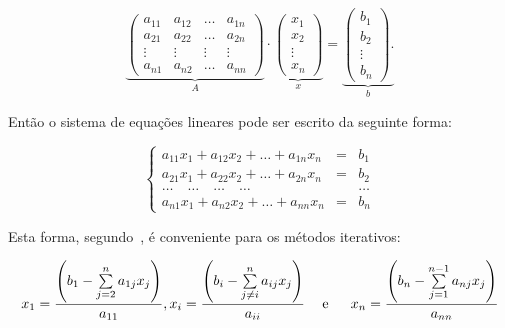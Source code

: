 \documentclass[glenn,refnum,codigo]{Estilo}
\begin{document}
\[
\underbrace{\left(
	\begin{array}{cccccc}
	a_{11} & a_{12} & \ldots & a_{1n} \\
	a_{21} & a_{22} & \ldots &a_{2n}  \\
	\vdots &\vdots  & \vdots &\vdots  \\
	a_{n1}&a_{n2}&\ldots &a_{nn}
	\end{array}
	\right)}_{A} %
\cdot
\underbrace{\left(
	\begin{array}{cccccc}
	x_{1}  \\
	x_{2}  \\
	\vdots \\
	x_{n}
	\end{array}
	\right)}_{x} %
=
\underbrace{\left(
	\begin{array}{cccccc}
	b_{1}\\
	b_{2}\\
	\vdots\\
	b_{n}
	\end{array}
	\right).}_{b} %
\]

Então o sistema de equações lineares pode ser escrito da seguinte forma:

\begin{equation}
\left\{
\begin{array}{ccl}
a_{11}x_1 + a_{12}x_2+ \ldots + a_{1n}x_n & = & b_1    \\
a_{21}x_1 + a_{22}x_2+ \ldots + a_{2n}x_n & = & b_2    \\
\ldots\quad\ldots\quad\ldots\quad\ldots  &   & \ldots \\
a_{n1}x_1+a_{n2}x_2 + \ldots + a_{nn}x_n  & = &b_n
\end{array}
\right.
\end{equation}

Esta forma, segundo~\cite{briggs}, é conveniente para os métodos iterativos:

\begin{equation}\label{mitera}
x_1=\dfrac{\left(b_1-\sum\limits_{j=2}^{n}a_{1j}x_j\right)}{a_{11}},
x_i=\dfrac{\left(b_i-\sum\limits_{j\neq i}^{n} a_{ij}x_j\right)}{a_{ii}} \hspace{1.25em}\hbox{e}\hspace{1.25em}\
x_n=\dfrac{\left(b_n-\sum\limits_{j=1}^{n-1} a_{nj}x_j\right)}{a_{nn}}
\end{equation}
\end{document}
